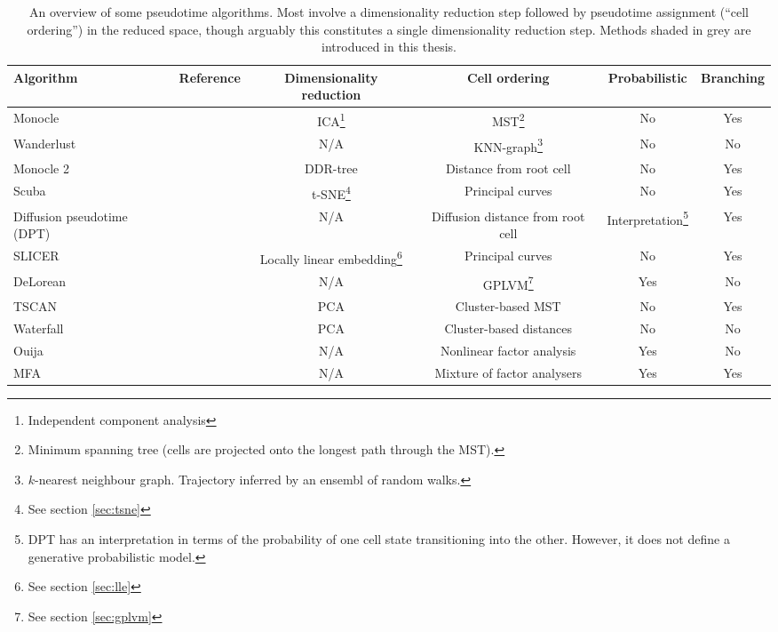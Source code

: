 \begin{sidewaystable}
  \centering
\begin{tabular}{|lccccc|}
\hline
Algorithm & Reference & Dimensionality reduction & Cell ordering & Probabilistic & Branching \\
\hline
Monocle & \cite{Trapnell2014-xi} & ICA\footnote{Independent component analysis} &
MST\footnote{Minimum spanning tree (cells are projected onto the longest path through the MST).} & No & Yes \\
Wanderlust & \cite{Bendall2014-rc} & N/A & KNN-graph\footnote{$k$-nearest neighbour graph. Trajectory inferred by an ensembl of random walks.} & No & No \\
Monocle 2 & \cite{Qiu2017-eu} & DDR-tree & Distance from root cell & No & Yes \\
Scuba & \cite{Marco2014-ug} & t-SNE\footnote{See section \ref{sec:tsne}} & Principal curves & No & Yes \\
Diffusion pseudotime (DPT) & \cite{Haghverdi2016-eg} & N/A & Diffusion distance from root cell &
Interpretation\footnote{DPT has an interpretation in terms of the probability of one cell state transitioning into the other. However, it does not define a generative probabilistic model.} & Yes \\
SLICER & \cite{welch2016slicer} & Locally linear embedding\footnote{See section \ref{sec:lle}} & Principal curves & No & Yes \\
DeLorean & \cite{reid2016pseudotime} & N/A & GPLVM\footnote{See section \ref{sec:gplvm}} & Yes & No \\
TSCAN & \cite{Ji2016-gx} & PCA & Cluster-based MST & No & Yes \\
Waterfall & \cite{shin2015single} & PCA & Cluster-based distances & No & No \\
\rowcolor{Gray}
Ouija & \cite{Campbell2016-ys} & N/A & Nonlinear factor analysis & Yes & No \\
\rowcolor{Gray}
MFA & \cite{campbell2017probabilistic} & N/A & Mixture of factor analysers & Yes & Yes \\
\hline
\end{tabular}
\caption{An overview of some pseudotime algorithms. Most involve a dimensionality reduction step followed by pseudotime assignment (``cell ordering'') in the reduced space, though arguably this constitutes a single dimensionality reduction step. Methods shaded in grey are introduced in this thesis.} \label{tbl:pseudotimecomparison}
\end{sidewaystable}


